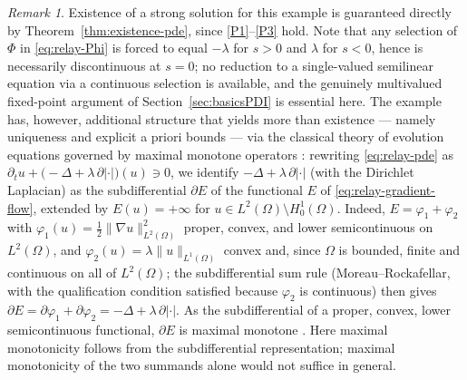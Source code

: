\documentclass[11pt]{elsarticle}
\theoremstyle{definition}
\theoremstyle{remark}
\newtheorem{remark}[theorem]{Remark}
\numberwithin{equation}{section}
\begin{document}
\begin{remark}\label{rem:relay-wellposed}
	Existence of a strong solution for this example is guaranteed
	directly by Theorem~\ref{thm:existence-pde}, since \ref{P1}--\ref{P3}
	hold. Note that any selection of $\Phi$ in \eqref{eq:relay-Phi} is
	forced to equal $-\lambda$ for $s>0$ and $\lambda$ for $s<0$, hence
	is necessarily discontinuous at $s=0$; no reduction to a single-valued
	semilinear equation via a continuous selection is available, and the
	genuinely multivalued fixed-point argument of
	Section~\ref{sec:basicsPDI} is essential here. The example has, however,
	additional structure that yields more than existence --- namely
	uniqueness and explicit a priori bounds --- via the classical theory
	of evolution equations governed by maximal monotone operators
	\cite{Brezis1973}: rewriting \eqref{eq:relay-pde} as
	$\partial_t u + \bigl(-\Delta+\lambda\,\partial|\cdot|\bigr)(u)\ni 0$,
	we identify $-\Delta+\lambda\,\partial|\cdot|$ (with the Dirichlet
	Laplacian) as the subdifferential $\partial E$ of the functional $E$ of
	\eqref{eq:relay-gradient-flow}, extended by $E(u)=+\infty$ for
	$u\in L^2(\Omega)\setminus H_0^1(\Omega)$. Indeed, $E=\varphi_1+\varphi_2$
	with $\varphi_1(u)=\tfrac12\|\nabla u\|_{L^2(\Omega)}^2$ proper, convex,
	and lower semicontinuous on $L^2(\Omega)$, and
	$\varphi_2(u)=\lambda\|u\|_{L^1(\Omega)}$ convex and, since $\Omega$ is
	bounded, finite and continuous on all of $L^2(\Omega)$; the subdifferential
	sum rule (Moreau--Rockafellar, with the qualification condition satisfied
	because $\varphi_2$ is continuous) then gives
	$\partial E=\partial\varphi_1+\partial\varphi_2
	=-\Delta+\lambda\,\partial|\cdot|$. As the subdifferential of a proper,
	convex, lower semicontinuous functional, $\partial E$ is maximal monotone
	\cite{Brezis1973}. Here maximal monotonicity follows from the
	subdifferential representation; maximal monotonicity of the two summands
	alone would not suffice in general.
	

\end{remark}
\end{document}
